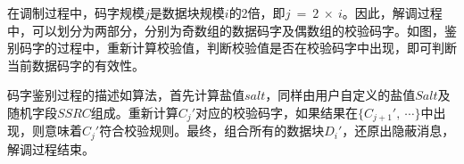 在调制过程中，码字规模$j$是数据块规模$i$的2倍，即$j\ =\ 2\ \times\ i$。因此，解调过程中，可以划分为两部分，分别为奇数组的数据码字及偶数组的校验码字。如图，鉴别码字的过程中，重新计算校验值，判断校验值是否在校验码字中出现，即可判断当前数据码字的有效性。

码字鉴别过程的描述如算法，首先计算盐值$salt$，同样由用户自定义的盐值$Salt$及随机字段$SSRC$组成。重新计算$C_{j}'$对应的校验码字，如果结果在$\{C_{j+1}',\ \cdots\}$中出现，则意味着$C_{j}'$符合校验规则。最终，组合所有的数据块$D_{i}'$，还原出隐蔽消息，解调过程结束。
